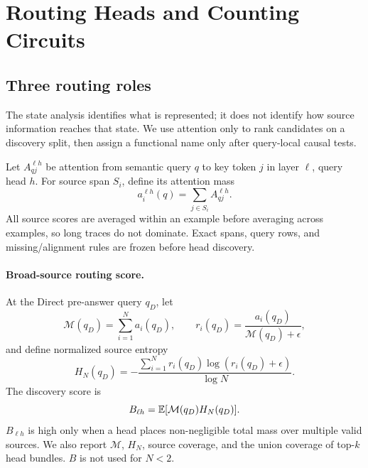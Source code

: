 \section{Routing Heads and Counting Circuits}
\label{sec:routing}

\subsection{Three routing roles}

The state analysis identifies what is represented; it does not identify how source information reaches that state. We use attention only to rank candidates on a discovery split, then assign a functional name only after query-local causal tests.

Let \(A_{qj}^{\ell h}\) be attention from semantic query \(q\) to key token \(j\) in layer \(\ell\), query head \(h\). For source span \(S_i\), define its attention mass
\begin{equation}
a_i^{\ell h}(q)=\sum_{j\in S_i}A_{qj}^{\ell h}.
\label{eq:source-mass}
\end{equation}
All source scores are averaged within an example before averaging across examples, so long traces do not dominate. Exact spans, query rows, and missing/alignment rules are frozen before head discovery.

\paragraph{Broad-source routing score.}
At the Direct pre-answer query \(q_D\), let
\[
\mathcal M(q_D)=\sum_{i=1}^{N}a_i(q_D),
\qquad
r_i(q_D)=\frac{a_i(q_D)}{\mathcal M(q_D)+\epsilon},
\]
and define normalized source entropy
\[
H_N(q_D)=
-\frac{\sum_{i=1}^{N}r_i(q_D)\log(r_i(q_D)+\epsilon)}
{\log N}.
\]
The discovery score is
\begin{equation}
B_{\ell h}=\mathbb{E}[\mathcal M(q_D)H_N(q_D)].
\label{eq:broad-score}
\end{equation}
\(B_{\ell h}\) is high only when a head places non-negligible total mass over multiple valid sources. We also report \(\mathcal M\), \(H_N\), source coverage, and the union coverage of top-\(k\) head bundles. \(B\) is not used for \(N<2\).

